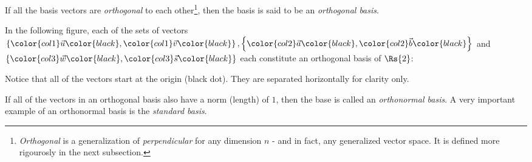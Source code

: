 If all the basis vectors are \emph{orthogonal} to each other\footnote{\emph{Orthogonal} is a generalization of \emph{perpendicular} for any dimension $n$ - and in fact, any generalized vector space. It is defined more rigourosly in the next subsection.}, then the basis is said to be an \emph{orthogonal basis}.
\begin{example}
  In the following figure, each of the sets of vectors $\left\{\color{col1}\vec{u}\color{black},\color{col1}\vec{v}\color{black}\right\},\left\{\color{col2}\vec{a}\color{black},\color{col2}\vec{b}\color{black}\right\}$ and $\left\{\color{col3}\vec{w}\color{black},\color{col3}\vec{s}\color{black}\right\}$ each constitute an orthogonal basis of $\Rs{2}$:

  \begin{figure}[H]
  \centering
  \end{figure}
  
  Notice that all of the vectors start at the origin (black dot). They are separated horizontally for clarity only.
\end{example}

If all of the vectors in an orthogonal basis also have a norm (length) of $1$, then the base is called an \emph{orthonormal basis}.
A very important example of an orthonormal basis is the \emph{standard basis}.


